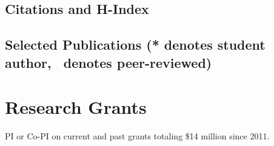 \documentclass[10pt]{article}
\begin{document}
    \subsection{Citations and H-Index}
    
  \subsection[Selected Publications]{Selected Publications (* denotes student author, \peerrevmark\ denotes peer-reviewed)}
    \begin{refsection}
    \nocite{vandenbergh:2017:beyond.politics,carrico:marriage:2020,elsawah:2020:grand.challenges,gilligan:2020:assessing.private.governance,gilligan:2020:beyond.wickedness,nielsen:2020:mitigation.analysis,gilligan:2019:collaboration,gilligan:2018:water.conservation,gilligan:2018:carrots.sticks,nay:2018:vegetation.health,wilson:2017:infilling,burchfield:2016:ag.adaptation,gunda:2016:drought,auerbach:2015:polders,gilligan:2014:political.feasibility,dietz:2009:behavioral.wedge}
    \printbibliography[heading=none]
    \end{refsection}

	\section{Research Grants}
	PI or Co-PI on current and past grants totaling \$14 million since 2011.
\end{document}
